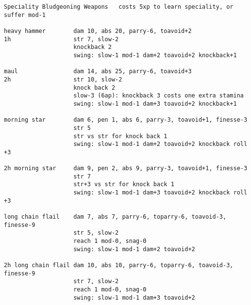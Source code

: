 \begin{verbatim}
\end{verbatim} \pagebreak[1] \begin{verbatim}
Speciality Bludgeoning Weapons   costs 5xp to learn speciality, or suffer mod-1

heavy hammer        dam 10, abs 20, parry-6, toavoid+2
1h                  str 7, slow-2
                    knockback 2
                    swing: slow-1 mod-1 dam+2 toavoid+2 knockback+1

maul                dam 14, abs 25, parry-6, toavoid+3
2h                  str 10, slow-2
                    knock back 2
                    slow-3 (6ap): knockback 3 costs one extra stamina
                    swing: slow-1 mod-1 dam+3 toavoid+2 knockback+1

morning star        dam 6, pen 1, abs 6, parry-3, toavoid+1, finesse-3
                    str 5
                    str vs str for knock back 1
                    swing: slow-1 mod-1 dam+2 toavoid+2 knockback roll +3

2h morning star     dam 9, pen 2, abs 9, parry-3, toavoid+1, finesse-3
                    str 7
                    str+3 vs str for knock back 1
                    swing: slow-1 mod-1 dam+3 toavoid+2 knockback roll +3

long chain flail    dam 7, abs 7, parry-6, toparry-6, toavoid-3, finesse-9
                    str 5, slow-2
                    reach 1 mod-0, snag-0
                    swing: slow-1 mod-1 dam+2 toavoid+2

2h long chain flail dam 10, abs 10, parry-6, toparry-6, toavoid-3, finesse-9
                    str 7, slow-2
                    reach 1 mod-0, snag-0
                    swing: slow-1 mod-1 dam+3 toavoid+2

\end{verbatim}
\normalsize






